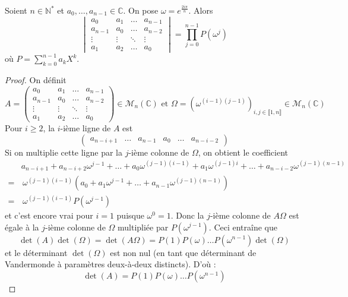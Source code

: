 






  \begin{lemma}
    \label{suite-de-polygones-1}
    Soient $n \in \mathbb{N}^*$ et $a_0, \dots, a_{n-1} \in \mathbb{C}$. On pose $\omega = e^{\frac{2i\pi}{n}}$. Alors
    \[ \begin{vmatrix} a_0 & a_1 & \dots & a_{n-1} \\ a_{n-1} & a_0 & \dots & a_{n-2}\\ \vdots & \vdots & \ddots & \vdots \\ a_1 & a_2 & \dots & a_0 \end{vmatrix} = \prod_{j=0}^{n-1} P(\omega^j) \]
    où $P = \sum_{k=0}^{n-1} a_k X^k$.
  \end{lemma}

  \begin{proof}
    On définit
    \[ A = \begin{pmatrix} a_0 & a_1 & \dots & a_{n-1} \\ a_{n-1} & a_0 & \dots & a_{n-2}\\ \vdots & \vdots & \ddots & \vdots \\ a_1 & a_2 & \dots & a_0 \end{pmatrix} \in \mathcal{M}_n(\mathbb{C}) \text{ et } \Omega = (\omega^{(i-1)(j-1)})_{i, j \in \llbracket 1, n \rrbracket} \in \mathcal{M}_n(\mathbb{C}) \]
    Pour $i \geq 2$, la $i$-ième ligne de $A$ est
    \[ \begin{pmatrix} a_{n-i+1} & \dots & a_{n-1} & a_0 & \dots & a_{n-i-2} \end{pmatrix} \]
    Si on multiplie cette ligne par la $j$-ième colonne de $\Omega$, on obtient le coefficient
    \begin{align*}
      &a_{n-i+1} + a_{n-i+2} \omega^{j-1} + \dots + a_0 \omega^{(j-1)(i-1)} + a_1 \omega^{(j-1)i} + \dots + a_{n-i-2} \omega^{(j-1)(n-1)} \\
      =& \, \omega^{(j-1)(i-1)} (a_0 + a_1 \omega^{j-1} + \dots + a_{n-1} \omega^{(j-1)(n-1)}) \\
      =& \, \omega^{(j-1)(i-1)} P(\omega^{j-1})
    \end{align*}
    et c'est encore vrai pour $i = 1$ puisque $\omega^0 = 1$. Donc la $j$-ième colonne de $A \Omega$ est égale à la $j$-ième colonne de $\Omega$ multipliée par $P(\omega^{j-1})$. Ceci entraîne que
    \[ \det(A) \det(\Omega) = \det(A\Omega) = P(1) P(\omega) \dots P(\omega^{n-1}) \det(\Omega) \]
    et le déterminant $\det(\Omega)$ est non nul (en tant que déterminant de Vandermonde à paramètres deux-à-deux distincts). D'où :
    \[ \det(A) = P(1) P(\omega) \dots P(\omega^{n-1}) \]
  \end{proof}

